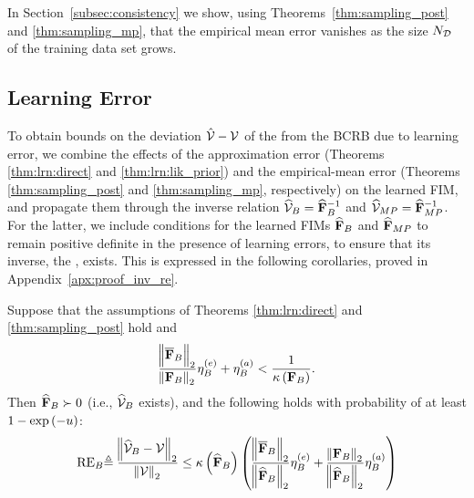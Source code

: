 {In %
Section~\ref{subsec:consistency} we %
show, using Theorems~\ref{thm:sampling_post} and \ref{thm:sampling_mp},
that the empirical mean error vanishes as the size $N_{\mathcal{D}}$ of the training data set grows.



\subsection{{\name{}} Learning Error%
}
\label{subsec:Conv_Invert}
{
}
{
To obtain bounds on the deviation $\hat{\mathcal{V}} -\mathcal{V} $ of the \name{} from the BCRB due to learning error, we combine the effects of the approximation error (Theorems \ref{thm:lrn:direct} and \ref{thm:lrn:lik_prior}) and the empirical-mean error (Theorems \ref{thm:sampling_post} and \ref{thm:sampling_mp}, respectively) on the learned FIM, and propagate them through the inverse relation $\widehat{\mathcal{V}}_{B} = \widehat{\mathbf{F}}_{B}^{-1} $ and $\widehat{\mathcal{V}}_{MP} = \widehat{\mathbf{F}}_{MP}^{-1}$. For the latter, we include conditions for the learned FIMs $\widehat{\mathbf{F}}_{B}$ and $\widehat{\mathbf{F}}_{MP}$ to remain positive definite in the presence of learning errors, to ensure that its inverse, the \name, exists. This is expressed in the following corollaries, proved in Appendix~\ref{apx:proof_inv_re}.
}
\begin{corollary}\label{corr:bound_inv_post}
Suppose that the assumptions of Theorems  {\ref{thm:lrn:direct} and} \ref{thm:sampling_post}  hold {and 
\begin{equation}\label{eq:inv_cond_post}
    \frac{\norm{\overline{\mathbf{F}}_{B}}_2}{\norm{\mathbf{F}_{B}}_2}\eta_{B}^{(e)}+\eta_{B}^{(a)} <\frac{1}{\kappa\left(\mathbf{F}_{B}\right)}.
\end{equation}
Then }
{$\widehat{\mathbf{F}}_{B}\succ 0$} {(i.e., %
$\widehat{\mathcal{V}}_{B}$ exists)}, 
{and} the following holds with probability {of at least} $1-\exp\left(-u\right)$:
\begin{align}\label{eq:inv_bound_post}
    \mathrm{RE}_{B} {\triangleq
    \frac{\norm{\widehat{\mathcal{V}}_{B}-\mathcal{V}}_2}{\norm{
    \mathcal{V}
    }_2}}
\leq\kappa\left(\widehat{\mathbf{F}}_{B}\right)\left(\frac{\norm{\overline{\mathbf{F}}_{B}}_2}{\norm{\widehat{\mathbf{F}}_{B}}_2}\eta_{B}^{(e)}+\frac{\norm{\mathbf{F}_{B}}_2}{\norm{\widehat{\mathbf{F}}_{B}}_2}\eta_{B}^{(a)}\right)
\end{align}
\end{corollary}

}
